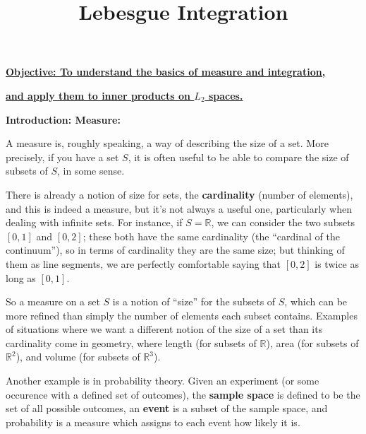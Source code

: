 \documentclass{article}
\begin{document}
\title{Lebesgue Integration}
\date{}

\maketitle
\thispagestyle{empty}

\Large

\vskip -10mm

\textbf{\underline{Objective: To understand the basics of measure and integration,}}

\textbf{\underline{and apply them to inner products on $L_2$ spaces.}}







\vspace{5mm}












\textbf{Introduction: Measure:}

\bigskip


A measure is, roughly speaking, a way of describing the size of a set. More precisely, if you have a set $S$, it is often useful to be able to compare the size of subsets of $S$, in some sense.

There is already a notion of size for sets, the \textbf{cardinality} (number of elements), and this is indeed a measure, but it's not always a useful one, particularly when dealing with infinite sets. For instance, if $S=\mathbb{R}$, we can consider the two subsets $[0,1]$ and $[0,2]$; these both have the same cardinality (the ``cardinal of the continuum''), so in terms of cardinality they are the same size; but thinking of them as line segments, we are perfectly comfortable saying that $[0,2]$ is twice as long as $[0,1]$.

So a measure on a set $S$ is a notion of ``size'' for the subsets of $S$, which can be more refined than simply the number of elements each subset contains. Examples of situations where we want a different notion of the size of a set than its cardinality come in geometry, where length (for subsets of $\mathbb{R}$), area (for subsets of $\mathbb{R}^2$), and volume (for subsets of $\mathbb{R}^3$).

Another example is in probability theory. Given an experiment (or some occurence with a defined set of outcomes), the \textbf{sample space} is defined to be the set of all possible outcomes, an \textbf{event} is a subset of the sample space, and probability is a measure which assigns to each event how likely it is.
\end{document}
